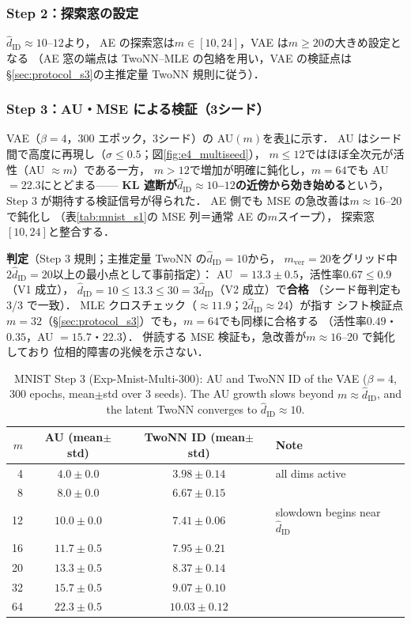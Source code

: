 \documentclass[11pt,a4paper]{jsarticle}
\newcommand{\hatdID}{\hat{d}_{\mathrm{ID}}}
\begin{document}
\subsubsection{Step 2：探索窓の設定}

$\hatdID \approx 10$--$12$より，
AE の探索窓は$m \in [10, 24]$，VAE は$m \geq 20$の大きめ設定となる
（AE 窓の端点は TwoNN--MLE の包絡を用い，VAE の検証点は
§\ref{sec:protocol_s3}の主推定量 TwoNN 規則に従う）．

\subsubsection{Step 3：AU・MSE による検証（3シード）}

VAE（$\beta = 4$，300 エポック，3シード）の AU$(m)$を表\ref{tab:mnist_s3}に示す．
AU はシード間で高度に再現し（$\sigma \leq 0.5$；図\ref{fig:e4_multiseed}），
$m \leq 12$ではほぼ全次元が活性（AU $\approx m$）である一方，
$m > 12$で増加が明確に鈍化し，$m = 64$でも AU $= 22.3$にとどまる——
\textbf{KL 遮断が$\hatdID \approx 10$--$12$の近傍から効き始める}という，
Step 3 が期待する検証信号が得られた．
AE 側でも MSE の急改善は$m \approx 16$--20 で鈍化し
（表\ref{tab:mnist_s1}の MSE 列＝通常 AE の$m$スイープ），
探索窓$[10, 24]$と整合する．

\textbf{判定}（Step 3 規則；主推定量 TwoNN の$\hatdID = 10$から，
$m_{\mathrm{ver}} = 20$をグリッド中$2\hatdID = 20$以上の最小点として事前指定）：
AU $= 13.3 \pm 0.5$，活性率$0.67 \leq 0.9$（V1 成立），
$\hatdID = 10 \leq 13.3 \leq 30 = 3\hatdID$（V2 成立）で\textbf{合格}
（シード毎判定も 3/3 で一致）．
MLE クロスチェック（$\approx 11.9$；$2\hatdID \approx 24$）が指す
シフト検証点$m = 32$（§\ref{sec:protocol_s3}）でも，$m = 64$でも同様に合格する
（活性率$0.49$・$0.35$，AU $= 15.7$・$22.3$）．
併読する MSE 検証も，急改善が$m \approx 16$--20 で鈍化しており
位相的障害の兆候を示さない．

\begin{table}[H]
\centering
\caption{MNIST Step 3 (Exp-Mnist-Multi-300): AU and TwoNN ID of the VAE
($\beta = 4$, 300 epochs, mean$\pm$std over 3 seeds). The AU growth slows
beyond $m \approx \hatdID$, and the latent TwoNN converges to
$\hatdID \approx 10$.}
\label{tab:mnist_s3}
\small
\begin{tabular}{rccl}
\toprule
$m$ & AU (mean$\pm$std) & TwoNN ID (mean$\pm$std) & Note \\
\midrule
 4 & $4.0 \pm 0.0$ & $3.98 \pm 0.14$ & all dims active \\
 8 & $8.0 \pm 0.0$ & $6.67 \pm 0.15$ & \\
12 & $10.0 \pm 0.0$ & $7.41 \pm 0.06$ & slowdown begins near $\hatdID$ \\
16 & $11.7 \pm 0.5$ & $7.95 \pm 0.21$ & \\
20 & $13.3 \pm 0.5$ & $8.37 \pm 0.14$ & \\
32 & $15.7 \pm 0.5$ & $9.07 \pm 0.10$ & \\
64 & $22.3 \pm 0.5$ & $10.03 \pm 0.12$ & \\
\bottomrule
\end{tabular}
\end{table}
\end{document}
